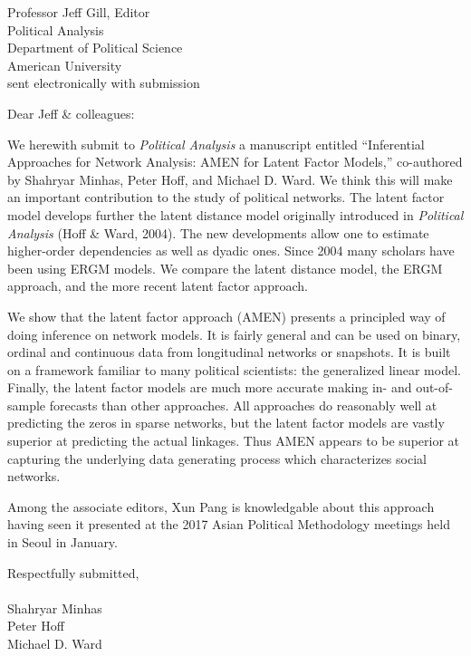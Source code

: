 \documentclass[10pt]{letter}
\begin{document}
\begin{letter}
{Professor Jeff Gill, Editor\\
Political Analysis\\
Department of Political Science\\
American University\\
sent electronically with submission}


\opening{Dear Jeff \& colleagues:}

We herewith submit to \textit{Political Analysis} a manuscript entitled ``Inferential Approaches for Network Analysis: AMEN for Latent Factor Models,'' co-authored by Shahryar Minhas, Peter Hoff, and Michael D. Ward.  We think this will make an important contribution to the study of political networks.  The latent factor model develops further the latent distance model originally introduced in \textit{Political Analysis} (Hoff \& Ward, 2004).  The new developments allow one to estimate higher-order dependencies as well as dyadic ones.  Since 2004 many scholars have been using ERGM models.  We compare the latent distance model, the ERGM approach, and the more recent latent factor approach.   

We show that the latent factor approach (AMEN) presents a principled way of doing inference on network models. It is fairly general and can be used on binary, ordinal and continuous data from longitudinal networks or snapshots. It is built on a framework familiar to many political scientists: the generalized linear model. Finally, the latent factor models are much more accurate making in- and out-of-sample forecasts than other approaches.  All approaches do reasonably well at predicting the zeros in sparse networks, but the latent factor models are vastly superior at predicting the actual linkages. Thus AMEN appears to be superior at capturing the underlying data generating process which characterizes social networks.

Among the associate editors, Xun Pang is knowledgable about this approach having seen it presented at the 2017 Asian Political Methodology meetings held in Seoul in January.  

\closing{Respectfully submitted,\\~\\ Shahryar Minhas\\Peter Hoff\\Michael D. Ward} \vspace{.1in}


\end{letter}
\end{document}
